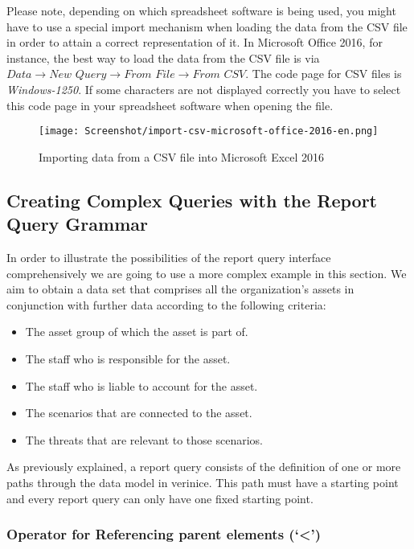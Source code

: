 \documentclass[a4paper,10pt]{book}
\providecommand{\tightlist}{%
  \setlength{\itemsep}{0pt}\setlength{\parskip}{0pt}}
\begin{document}
Please note, depending on which spreadsheet software is being used, you might
have to use a special import mechanism when loading the data from the CSV file
in order to attain a correct representation of it. In Microsoft Office 2016, for
instance, the best way to load the data from the CSV file is via
$\textit{Data}\to\textit{New Query}\to\textit{From File}\to\textit{From CSV}$.
The code page for CSV files is \textit{Windows-1250}. If some characters are not
displayed correctly you have to select this code page in your spreadsheet software
when opening the file.

\begin{figure}[htb!]
  \centering
  \texttt{[image: Screenshot/import-csv-microsoft-office-2016-en.png]}
  \caption{Importing data from a CSV file into Microsoft Excel 2016}
  \label{fig:importing-data-from-a-csv-file-into-microsoft-excel-2016}
\end{figure}

\subsection{Creating Complex Queries with the Report Query
Grammar}\label{creating-complex-queries-with-the-report-query-grammar}

In order to illustrate the possibilities of the report query interface
comprehensively we are going to use a more complex example in this section. We
aim to obtain a data set that comprises all the organization's assets in
conjunction with further data according to the following criteria:

\begin{itemize}
\tightlist
\item
  The asset group of which the asset is part of.
\item
  The staff who is responsible for the asset.
\item
  The staff who is liable to account for the asset.
\item
  The scenarios that are connected to the asset.
\item
  The threats that are relevant to those scenarios.
\end{itemize}

As previously explained, a report query consists of the definition of one or
more paths through the data model in verinice. This path must have a starting
point and every report query can only have one fixed starting point.

\subsubsection{\texorpdfstring{Operator for Referencing parent elements
(`\textless{}')}{Operator for Referencing parent elements (\textless{})}}\label{operator-for-referencing-parent-elements}
\end{document}
